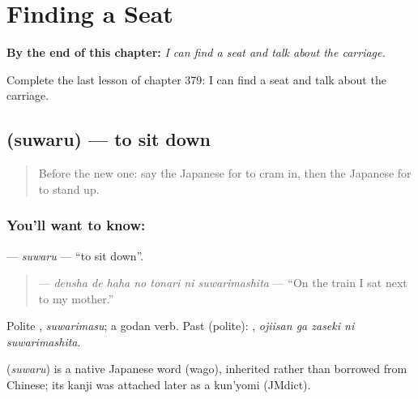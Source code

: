 
\chapter{Finding a Seat}
\label{ch:ja-finding-a-seat}

\begin{chapteropening}
\textbf{By the end of this chapter:} \emph{I can find a seat and talk about the carriage.}

Complete the last lesson of chapter 379: I can find a seat and talk about the carriage.
\end{chapteropening}

\section[\texorpdfstring{\ja{すわる} (suwaru)}{すわる (suwaru)}]{ (suwaru) — to sit down}

\label{lesson:JA-C379-suwaru}



\begin{quote}
Before the new one: say the Japanese for to cram in, then the Japanese for to stand up.
\end{quote}

\subsection*{You'll want to know: }
\textbf{} — \emph{suwaru} — \textquotedblleft{}to sit down\textquotedblright{}.

\begin{quote}
\textbf{   } — \emph{densha de haha no tonari ni suwarimashita} — \textquotedblleft{}On the train I sat next to my mother.\textquotedblright{}
\end{quote}

Polite \textbf{}, \emph{suwarimasu}; a godan verb. Past (polite): \textbf{  }, \emph{ojiisan ga zaseki ni suwarimashita}.

\begin{cousinweb}
\textbf{} (\emph{suwaru}) is a native Japanese word (wago), inherited rather than borrowed from Chinese; its kanji was attached later as a kun'yomi (JMdict).
\end{cousinweb}

